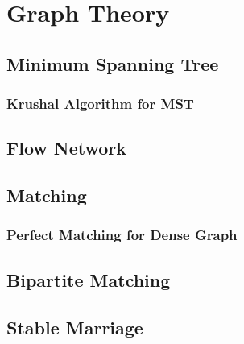 \newpage
\section{Graph Theory}
\subsection{Minimum Spanning Tree}
\subsubsection{Krushal Algorithm for MST}


\subsection{Flow Network}

\subsection{Matching}

\subsubsection{Perfect Matching for Dense Graph}

\subsection{Bipartite Matching}


\subsection{Stable Marriage}


